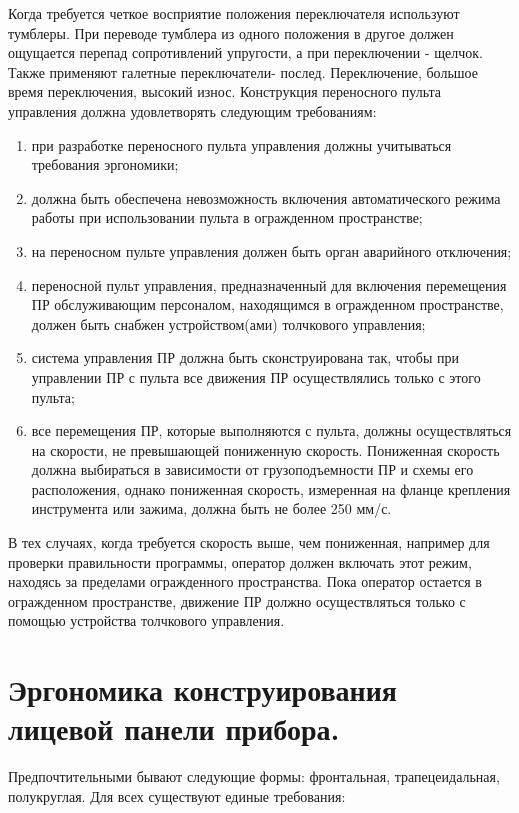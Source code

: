 \documentclass[unicode, 12pt, a4paper, oneside]{article}
\begin{document}
Когда требуется четкое восприятие положения переключателя используют тумблеры. При переводе тумблера из одного положения в другое должен ощущается перепад сопротивлений упругости, а  при переключении - щелчок.
Также применяют галетные переключатели- послед. Переключение, большое время переключения, высокий износ.
Конструкция переносного пульта управления должна удовлетворять следующим требованиям:

\begin{enumerate}  
\item при разработке переносного пульта управления должны учитываться требования эргономики; 
\item должна быть обеспечена невозможность включения автоматического режима работы при использовании пульта в огражденном пространстве; 
\item на переносном пульте управления должен быть орган аварийного отключения; 
\item переносной пульт управления, предназначенный для включения перемещения ПР обслуживающим персоналом, находящимся в огражденном пространстве, должен быть снабжен устройством(ами) толчкового управления; 
\item система управления ПР должна быть сконструирована так, чтобы при управлении ПР с пульта все движения ПР осуществлялись только с этого пульта; 
\item все перемещения ПР, которые выполняются с пульта, должны осуществляться на скорости, не превышающей пониженную скорость. Пониженная скорость должна выбираться в зависимости от грузоподъемности ПР и схемы его расположения, однако пониженная скорость, измеренная на фланце крепления инструмента или зажима, должна быть не более 250 мм/с. 
\end{enumerate}

В тех случаях, когда требуется скорость выше, чем пониженная, например для проверки правильности программы, оператор должен включать этот режим, находясь за пределами огражденного пространства. Пока оператор остается в огражденном пространстве, движение ПР должно осуществляться только с помощью устройства толчкового управления.

\section{Эргономика конструирования лицевой панели прибора.}

Предпочтительными бывают следующие формы: фронтальная, трапецеидальная, полукруглая. Для всех существуют единые требования:
\end{document}
